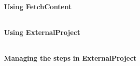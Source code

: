 


\hspace*{\fill} \\ %
\noindent
\textbf{Using FetchContent}


\hspace*{\fill} \\ %
\noindent
\textbf{Using ExternalProject}


\hspace*{\fill} \\ %
\noindent
\textbf{Managing the steps in ExternalProject}